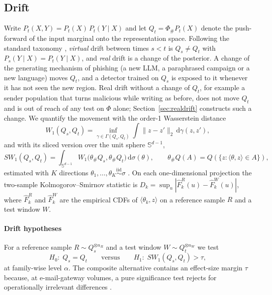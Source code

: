 \subsection{Drift}
Write $P_t(X,Y)=P_t(X)\,P_t(Y\mid X)$ and let $Q_t=\Phi_\#P_t(X)$ denote the push-forward of the input marginal onto the representation space. Following the standard taxonomy \cite{lu2019,hinder2024}, \emph{virtual} drift between times $s<t$ is $Q_s\neq Q_t$ with $P_s(Y\mid X)=P_t(Y\mid X)$, and \emph{real} drift is a change of the posterior. A change of the generating mechanism of phishing (a new LLM, a paraphrased campaign or a new language) moves $Q_t$, and a detector trained on $Q_s$ is exposed to it whenever it has not seen the new region. Real drift without a change of $Q_t$, for example a sender population that turns malicious while writing as before, does not move $Q_t$ and is out of reach of any test on $\Phi$ alone; Section~\ref{sec:realdrift} constructs such a change. We quantify the movement with the order-1 Wasserstein distance
\begin{equation}
W_1(Q_s,Q_t)=\inf_{\gamma\in\Gamma(Q_s,Q_t)}\int\lVert z-z'\rVert_2\,\mathrm{d}\gamma(z,z'),
\end{equation}
and with its sliced version over the unit sphere $\mathbb{S}^{d-1}$,
\begin{equation}
SW_1(Q_s,Q_t)=\int_{\mathbb{S}^{d-1}}W_1\big(\theta_\#Q_s,\theta_\#Q_t\big)\,\mathrm{d}\sigma(\theta),\qquad \theta_\#Q(A)=Q(\{z:\langle\theta,z\rangle\in A\}),
\label{eq:sw}
\end{equation}
estimated with $K$ directions $\theta_1,\dots,\theta_K\overset{\mathrm{iid}}{\sim}\sigma$ \cite{kolouri2016}. On each one-dimensional projection the two-sample Kolmogorov--Smirnov statistic is $D_k=\sup_u|\hat F^{R}_{k}(u)-\hat F^{W}_{k}(u)|$, where $\hat F^{R}_{k}$ and $\hat F^{W}_{k}$ are the empirical CDFs of $\langle\theta_k,z\rangle$ on a reference sample $R$ and a test window $W$.

\paragraph{Drift hypotheses} For a reference sample $R\sim Q_s^{\otimes n_R}$ and a test window $W\sim Q_t^{\otimes n_W}$ we test
\begin{equation}
H_0:\;Q_s=Q_t\qquad\text{versus}\qquad H_1:\;SW_1(Q_s,Q_t)>\tau ,
\end{equation}
at family-wise level $\alpha$. The composite alternative contains an effect-size margin $\tau$ because, at e-mail-gateway volumes, a pure significance test rejects for operationally irrelevant differences \cite{demsar2006}.

